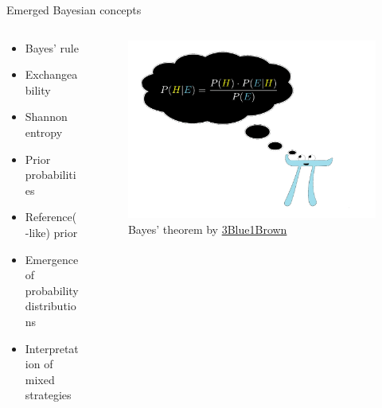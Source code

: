 \documentclass{beamer}
\theoremstyle{definition}
\begin{document}
\begin{frame}{Emerged Bayesian concepts}


\begin{columns}

\begin{column}{0.5\textwidth}
            
\begin{itemize}
    \item Bayes' rule 
    \item Exchangeability
    \item Shannon entropy
    \item Prior probabilities
    \item Reference(-like) prior
    \item Emergence of probability distributions
    \item Interpretation of mixed strategies
\end{itemize}
        \end{column}

\begin{column}{0.5\textwidth}
    \begin{figure}
    \centering
        \includegraphics[width=\textwidth]{img/BlueBayes.png}
        \caption{\small \centering  Bayes' theorem by \href{https://www.3blue1brown.com/lessons/bayes-theorem}{3Blue1Brown}}
    \end{figure}
\end{column}
        

\end{columns}


\end{frame}
\end{document}
